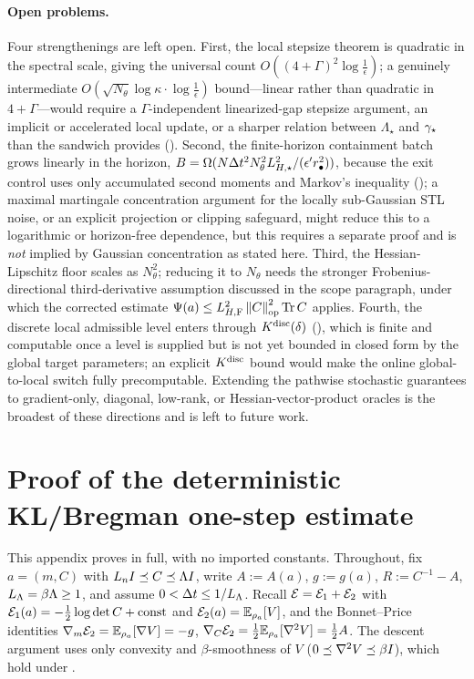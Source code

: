\paragraph{Open problems.}
Four strengthenings are left open. First, the local stepsize theorem is quadratic in the spectral
scale, giving the universal count $O((4+\Gamma)^2\log\tfrac1\epsilon)$; a genuinely intermediate
$O(\sqrt{N_\theta}\log\kappa\cdot\log\tfrac1\epsilon)$ bound---linear rather than quadratic in
$4+\Gamma$---would require a $\Gamma$-independent linearized-gap stepsize argument, an implicit or
accelerated local update, or a sharper relation between $\Lambda_\star$ and $\gamma_\star$ than the sandwich
provides (). Second, the finite-horizon containment batch grows linearly in the
horizon, $B=\Omega(N\Delta t^2N_\theta^2L_{H,\star}^2/(\epsilon'r_\bullet^2))$, because the exit control uses
only accumulated second moments and Markov's inequality (); a maximal
martingale concentration argument for the locally sub-Gaussian STL noise, or an explicit projection or
clipping safeguard, might reduce this to a logarithmic or horizon-free dependence, but this requires a
separate proof and is \emph{not} implied by Gaussian concentration as stated here. Third, the
Hessian-Lipschitz floor scales as $N_\theta^2$; reducing it to $N_\theta$ needs the stronger
Frobenius-directional third-derivative assumption discussed in the scope paragraph, under which the
corrected estimate $\Psi(a)\leq L_{H,\mathrm{F}}^2\left\lVert C\right\rVert_{\mathrm{op}}^2\operatorname{Tr} C$ applies. Fourth, the discrete local admissible level
enters through $K^{\mathrm{disc}}(\delta)$ (), which is finite and computable once a level
is supplied but is not yet bounded in closed form by the global target parameters; an explicit
$K^{\mathrm{disc}}$ bound would make the online global-to-local switch fully precomputable. Extending the
pathwise stochastic guarantees to gradient-only, diagonal, low-rank, or Hessian-vector-product oracles
is the broadest of these directions and is left to future work.
\appendix

\section{Proof of the deterministic KL/Bregman one-step estimate}
\label{app:KL-onestep}

This appendix proves  in full, with no imported constants. Throughout, fix
$a=(m,C)$ with $L_nI\preceq C\preceq\Lambda I$, write $A:=A(a)$, $g:=g(a)$, $R:=C^{-1}-A$,
$L_\Lambda=\beta\Lambda\geq1$, and assume $0<\Delta t\leq1/L_\Lambda$. Recall $\mathcal{E}=\mathcal{E}_1+\mathcal{E}_2$ with
$\mathcal{E}_1(a)=-\tfrac12\log\det C+\text{const}$ and $\mathcal{E}_2(a)=\mathbb{E}_{\rho_a}[V]$, and the Bonnet--Price
identities $\nabla_m\mathcal{E}_2=\mathbb{E}_{\rho_a}[\nabla V]=-g$, $\nabla_C\mathcal{E}_2=\tfrac12\mathbb{E}_{\rho_a}[\nabla^2V]=\tfrac12A$.
The descent argument uses only convexity and $\beta$-smoothness of $V$ ($0\preceq\nabla^2V\preceq\beta I$),
which hold under .

